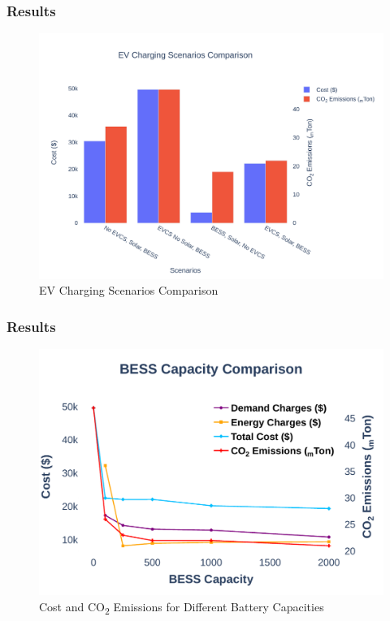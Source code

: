 \documentclass[aspectratio=169, 8 pt]{beamer}
\begin{document}
		\begin{frame}
			\frametitle{Results}
			\begin{figure}
				\centering
				\includegraphics[width=0.7\linewidth]{Fig/mg_scene_comparison}
				\caption{EV Charging Scenarios Comparison}
				\label{fig:mgscenecomparison}
			\end{figure}
		\end{frame}
	
		\begin{frame}
			\frametitle{Results}
			\begin{figure}
				\centering
				\includegraphics[width=0.7\linewidth]{Fig/bess_capacity_comparison_large_font}
				\caption{Cost and CO\textsubscript{2} Emissions for Different Battery Capacities}
				\label{fig:besscapacitycomparison}
			\end{figure}
		\end{frame}
	
\end{document}
